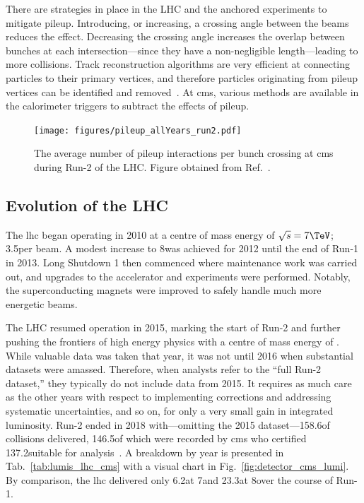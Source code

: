 There are strategies in place in the LHC and the anchored experiments to mitigate \gls{pileup}. Introducing, or increasing, a crossing angle between the beams reduces the effect. Decreasing the crossing angle increases the overlap between bunches at each intersection---since they have a non-negligible length---leading to more collisions. Track reconstruction algorithms are very efficient at connecting particles to their primary vertices, and therefore particles originating from \gls{pileup} vertices can be identified and removed~\cite{Chatrchyan:2014fea,Aaboud:2017all}. At \acrshort{cms}, various methods are available in the calorimeter triggers to subtract the effects of \gls{pileup}.

\begin{figure}[htbp]
    \centering
    \texttt{[image: figures/pileup\_allYears\_run2.pdf]}
    \caption[The average number of pileup interactions per bunch crossing at CMS during Run-2 of the LHC]{The average number of \gls{pileup} interactions per bunch crossing at \acrshort{cms} during Run-2 of the LHC. Figure obtained from Ref.~.}
    \label{fig:detector_cms_pileup}
\end{figure}




\subsection{Evolution of the LHC}
\label{subsec:evolution_lhc}

The \acrshort{lhc} began operating in 2010 at a centre of mass energy of $\sqrt{s} = \text{7}\TeV$; 3.5\TeV per beam. A modest increase to 8\TeV was achieved for 2012 until the end of Run-1 in 2013. Long Shutdown 1 then commenced where maintenance work was carried out, and upgrades to the accelerator and experiments were performed. Notably, the superconducting magnets were improved to safely handle much more energetic beams.

The LHC resumed operation in 2015, marking the start of Run-2 and further pushing the frontiers of high energy physics with a centre of mass energy of \comruntwo. While valuable data was taken that year, it was not until 2016 when substantial datasets were amassed. Therefore, when analysts refer to the ``full Run-2 dataset,'' they typically do not include data from 2015. It requires as much care as the other years with respect to implementing corrections and addressing systematic uncertainties, and so on, for only a very small gain in integrated luminosity. Run-2 ended in 2018 with---omitting the 2015 dataset---158.6\fbinv of \pp collisions delivered, 146.5\fbinv of which were recorded by \acrshort{cms} who certified 137.2\fbinv suitable for analysis~\cite{cmslumitwikipage,cmslumipogpage}. A breakdown by year is presented in Tab.~\ref{tab:lumis_lhc_cms} with a visual chart in Fig.~\ref{fig:detector_cms_lumi}. By comparison, the \acrshort{lhc} delivered only 6.2\fbinv at 7\TeV and 23.3\fbinv at 8\TeV over the course of Run-1.

